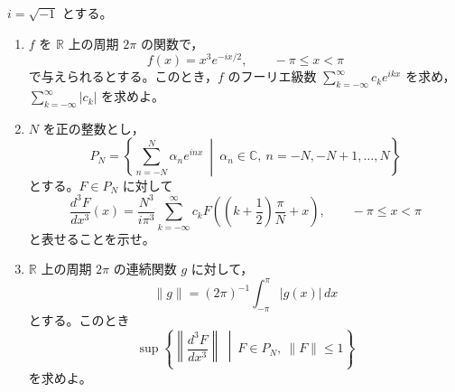 \documentclass[12pt]{jlreq}
\newcommand{\C}{\mathbb{C}}
\newcommand{\R}{\mathbb{R}}
\newcommand{\dd}{\,d}
\begin{document}
\(i=\sqrt{-1}\) とする。

\begin{enumerate}
  \item \(f\) を \(\R\) 上の周期 \(2\pi\) の関数で，
  \[
    f(x)=x^3e^{-ix/2},\qquad -\pi\le x<\pi
  \]
  で与えられるとする。このとき，\(f\) のフーリエ級数 \(\displaystyle\sum_{k=-\infty}^{\infty}c_ke^{ikx}\) を求め，\(\displaystyle\sum_{k=-\infty}^{\infty}|c_k|\) を求めよ。
  \item \(N\) を正の整数とし，
  \[
    P_N=\left\{\sum_{n=-N}^{N}\alpha_ne^{inx}\ \middle|\ \alpha_n\in\C,\ n=-N,-N+1,\ldots,N\right\}
  \]
  とする。\(F\in P_N\) に対して
  \[
    \frac{d^3F}{dx^3}(x)=\frac{N^3}{i\pi^3}\sum_{k=-\infty}^{\infty}
    c_kF\left(\left(k+\frac12\right)\frac{\pi}{N}+x\right),\qquad -\pi\le x<\pi
  \]
  と表せることを示せ。
  \item \(\R\) 上の周期 \(2\pi\) の連続関数 \(g\) に対して，
  \[
    \|g\|=(2\pi)^{-1}\int_{-\pi}^{\pi}|g(x)|\dd x
  \]
  とする。このとき
  \[
    \sup\left\{\left\|\frac{d^3F}{dx^3}\right\|\ \middle|\ F\in P_N,\ \|F\|\le1\right\}
  \]
  を求めよ。
\end{enumerate}
\end{document}
